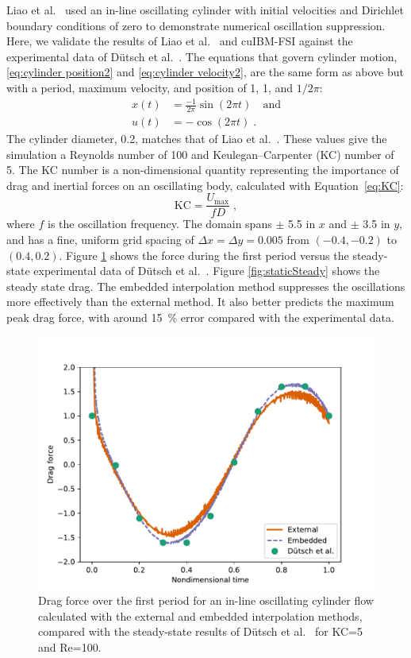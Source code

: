 \documentclass[preprint,12pt]{elsarticle}
\begin{document}
Liao et al.~\cite{liao2010simulating} used an in-line oscillating cylinder with initial velocities
and Dirichlet boundary conditions of zero to demonstrate numerical oscillation suppression.
Here, we validate the results of Liao et al.~\cite{liao2010simulating} and cuIBM-FSI
against the experimental data of D\"{u}tsch et al.~\cite{dutsch1998low}.
The equations that govern cylinder motion, \eqref{eq:cylinder position2} and \eqref{eq:cylinder velocity2}, are
the same form as above but with a period, maximum velocity, and position of 1, 1, and $1/2\pi$:
\begin{align}
x(t) &= \frac{-1}{2\pi} \sin(2\pi t) \quad \text{and} \label{eq:cylinder position2}\\
u(t) &= -\cos(2\pi t) \;. \label{eq:cylinder velocity2}
\end{align}
The cylinder diameter, 0.2, matches that of Liao et al.~\cite{liao2010simulating}.
These values give the simulation a Reynolds number of 100 and Keulegan--Carpenter (KC) number of 5.
The KC number is a non-dimensional quantity representing the importance of drag and
inertial forces on an oscillating body, calculated with Equation~\eqref{eq:KC}:
\begin{equation}
\text{KC} = \frac{U_\text{max}}{fD} \label{eq:KC} \;,
\end{equation}
where $f$ is the oscillation frequency.
The domain spans $\pm$ 5.5 in $x$ and $\pm$ 3.5 in $y$, and has a fine, uniform grid
spacing of $\Delta x = \Delta y = 0.005$ from $(-0.4,-0.2)$ to $(0.4,0.2)$.
Figure \ref{fig:staticInit} shows the force during the first period versus the steady-state
experimental data of D\"{u}tsch et al.~\cite{dutsch1998low}.
Figure \ref{fig:staticSteady} shows the steady state drag.
The embedded interpolation method suppresses the oscillations more effectively than the external method.
It also better predicts the maximum peak drag force, with around \SI{15}{\percent}
error compared with the experimental data.
\begin{figure}[htbp]
    \centering
    \includegraphics[width=0.75\linewidth]{static_init.pdf}
    \caption{Drag force over the first period for an in-line oscillating cylinder flow
    calculated with the external and embedded interpolation methods, compared with the
    steady-state results of D\"{u}tsch et al.~\cite{dutsch1998low} for KC=5 and Re=100.
    }
    \label{fig:staticInit}
\end{figure}
\end{document}
